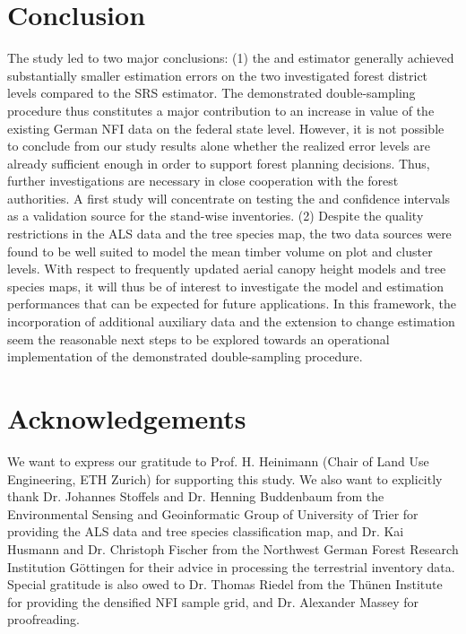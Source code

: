 
\section{Conclusion}
\label{sec:concl}

The study led to two major conclusions: (1) the \extpsynth{} and \psmall{} estimator generally achieved substantially smaller estimation errors on the two investigated forest district levels compared to the SRS estimator. The demonstrated double-sampling procedure thus constitutes a major contribution to an increase in value of the existing German NFI data on the federal state level. However, it is not possible to conclude from our study results alone whether the realized error levels are already sufficient enough in order to support forest planning decisions. Thus, further investigations are necessary in close cooperation with the forest authorities. A first study will concentrate on testing the \extpsynth{} and \psmall{} confidence intervals as a validation source for the stand-wise inventories. (2) Despite the quality restrictions in the ALS data and the tree species map, the two data sources were found to be well suited to model the mean timber volume on plot and cluster levels. With respect to frequently updated aerial canopy height models and tree species maps, it will thus be of interest to investigate the model and estimation performances that can be expected for future applications. In this framework, the incorporation of additional auxiliary data and the extension to change estimation seem the reasonable next steps to be explored towards an operational implementation of the demonstrated double-sampling procedure.



\section*{Acknowledgements}
We want to express our gratitude to Prof. H. Heinimann (Chair of Land Use Engineering, ETH Zurich) for supporting this study. We also want to explicitly thank Dr. Johannes Stoffels and Dr. Henning Buddenbaum from the Environmental Sensing and Geoinformatic Group of University of Trier for providing the ALS data and tree species classification map, and Dr. Kai Husmann and Dr. Christoph Fischer from the Northwest German Forest Research Institution G{\"o}ttingen for their advice in processing the terrestrial inventory data. Special gratitude is also owed to Dr. Thomas Riedel from the Th{\"u}nen Institute for providing the densified NFI sample grid, and Dr. Alexander Massey for proofreading.
